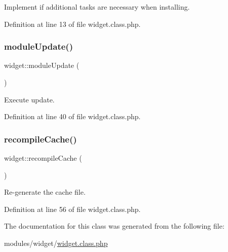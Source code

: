 Implement if additional tasks are necessary when installing. 



Definition at line 13 of file widget.\+class.\+php.

\mbox{\label{classwidget_ae12b6e9bc84250539e3aa09c1e1e6f77}} 
\subsubsection{\texorpdfstring{module\+Update()}{moduleUpdate()}}
{\footnotesize\ttfamily widget\+::module\+Update (\begin{DoxyParamCaption}{ }\end{DoxyParamCaption})}



Execute update. 



Definition at line 40 of file widget.\+class.\+php.

\mbox{\label{classwidget_a958eb4fd79b5c9834f04d866bc6b5d02}} 
\subsubsection{\texorpdfstring{recompile\+Cache()}{recompileCache()}}
{\footnotesize\ttfamily widget\+::recompile\+Cache (\begin{DoxyParamCaption}{ }\end{DoxyParamCaption})}



Re-\/generate the cache file. 



Definition at line 56 of file widget.\+class.\+php.



The documentation for this class was generated from the following file\+:\begin{DoxyCompactItemize}
\item 
modules/widget/\hyperlink{widget_8class_8php}{widget.\+class.\+php}\end{DoxyCompactItemize}
